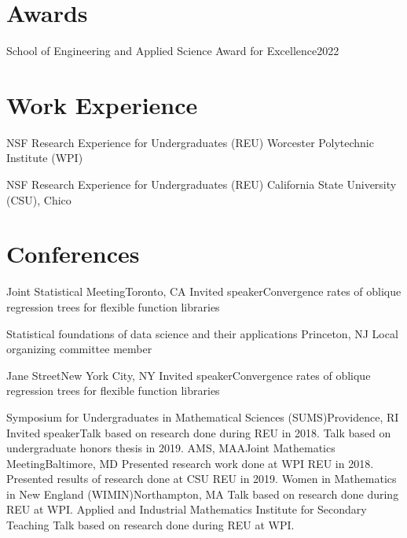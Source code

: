 \documentclass[10pt,a4paper,roman]{moderncv}        %
\begin{document}
\section{Awards}
{School of Engineering and Applied Science Award for Excellence}{2022}
{}{}

\section{Work Experience}
{NSF Research Experience for Undergraduates (REU) }
{Worcester Polytechnic Institute (WPI)}
{} {
}

{NSF Research Experience for Undergraduates (REU)}
{California State University (CSU), Chico}
{}
{}

\section{Conferences}
{Joint Statistical Meeting}{Toronto, CA}
{Invited speaker}{Convergence rates of oblique regression trees for flexible function libraries}

{Statistical foundations of data science and their applications}
{Princeton, NJ}
{}{Local organizing committee member}

{Jane Street}{New York City, NY}
{Invited speaker}{Convergence rates of oblique regression trees for flexible function libraries}

{Symposium for Undergraduates in Mathematical Sciences (SUMS)}{Providence, RI}
{Invited speaker}{Talk based on research done during REU in 2018.
  Talk based on undergraduate honors thesis in 2019.}
{AMS, MAA}{Joint Mathematics Meeting}{Baltimore, MD}
{}{Presented research work done at WPI REU in 2018.
  Presented results of research done at CSU REU in 2019.}
{Women in Mathematics in New England (WIMIN)}{Northampton, MA}
{}{Talk based on research done during REU at WPI.}
{Applied and Industrial Mathematics Institute for Secondary Teaching}
{Talk based on research done during REU at WPI.}
\end{document}
